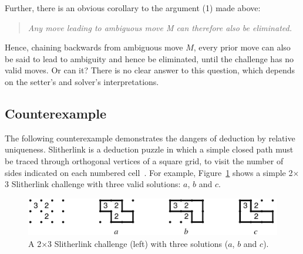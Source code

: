 \documentclass{gapd}
\begin{document}
Further, there is an obvious corollary to the argument (1) made above:

\begin{quote}\itshape
  Any move leading to ambiguous move M can therefore also be
  eliminated.
\end{quote}

Hence, chaining backwards from ambiguous move $M$, every prior move
can also be said to lead to ambiguity and hence be eliminated, until
the challenge has no valid moves.  Or can it?  There is no clear
answer to this question, which depends on the setter's and solver's
interpretations.

\subsection{Counterexample}
\label{sec:Counteraxeample}

The following counterexample demonstrates the dangers of deduction by
relative uniqueness.  Slitherlink is a deduction puzzle in which a
simple closed path must be traced through orthogonal vertices of a
square grid, to visit the number of sides indicated on each numbered
cell~\cite{times}.  For example, Figure~\ref{fig:SlitherlinkSolutions}
shows a simple 2$\times$3 Slitherlink challenge with three valid
solutions: $a$, $b$ and $c$.

\begin{figure}[!thb]
  \centering
  \includegraphics[width=\linewidth]{graphics/slitherlink-solns-1.pdf}
  \caption{A 2$\times$3
  Slitherlink challenge (left) with three solutions ($a$, $b$ and
  $c$).}
  \label{fig:SlitherlinkSolutions}
\end{figure}
\end{document}
